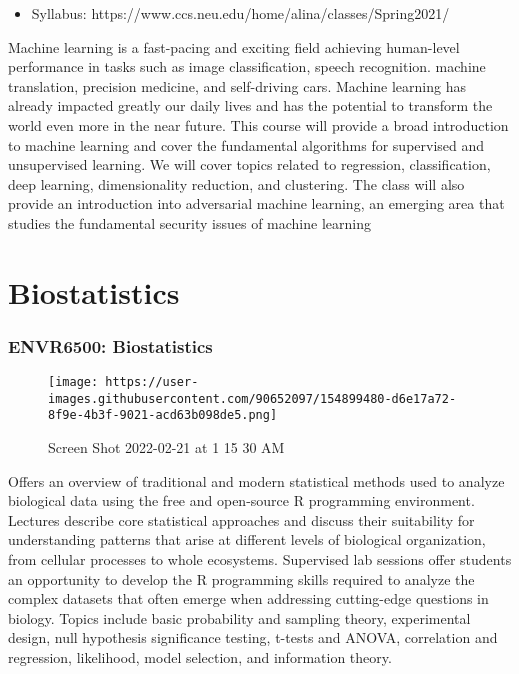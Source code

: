 \documentclass[
  letterpaper,
  DIV=11,
  numbers=noendperiod]{scrreprt}
\providecommand{\tightlist}{%
  \setlength{\itemsep}{0pt}\setlength{\parskip}{0pt}}\usepackage{longtable,booktabs,array}
\begin{document}
\begin{itemize}
\tightlist
\item
  Syllabus: https://www.ccs.neu.edu/home/alina/classes/Spring2021/
\end{itemize}

Machine learning is a fast-pacing and exciting field achieving
human-level performance in tasks such as image classification, speech
recognition. machine translation, precision medicine, and self-driving
cars. Machine learning has already impacted greatly our daily lives and
has the potential to transform the world even more in the near future.
This course will provide a broad introduction to machine learning and
cover the fundamental algorithms for supervised and unsupervised
learning. We will cover topics related to regression, classification,
deep learning, dimensionality reduction, and clustering. The class will
also provide an introduction into adversarial machine learning, an
emerging area that studies the fundamental security issues of machine
learning

\hypertarget{biostatistics}{%
\section*{\texorpdfstring{\textbf{Biostatistics}}{Biostatistics}}\label{biostatistics}}


\hypertarget{envr6500-biostatistics}{%
\subsubsection*{\texorpdfstring{\textbf{ENVR6500:
Biostatistics}}{ENVR6500: Biostatistics}}\label{envr6500-biostatistics}}

\begin{figure}

{\centering \texttt{[image: https://user-images.githubusercontent.com/90652097/154899480-d6e17a72-8f9e-4b3f-9021-acd63b098de5.png]}

}

\caption{Screen Shot 2022-02-21 at 1 15 30 AM}

\end{figure}

Offers an overview of traditional and modern statistical methods used to
analyze biological data using the free and open-source R programming
environment. Lectures describe core statistical approaches and discuss
their suitability for understanding patterns that arise at different
levels of biological organization, from cellular processes to whole
ecosystems. Supervised lab sessions offer students an opportunity to
develop the R programming skills required to analyze the complex
datasets that often emerge when addressing cutting-edge questions in
biology. Topics include basic probability and sampling theory,
experimental design, null hypothesis significance testing, t-tests and
ANOVA, correlation and regression, likelihood, model selection, and
information theory.
\end{document}
